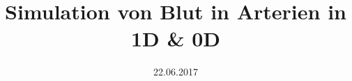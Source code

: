 \documentclass{beamer}
\title[Simulation von Blutfluss in Arterien]{Simulation von Blut in Arterien in 1D \& 0D}
\subtitle{}
\author{}
\date{22.06.2017}
\begin{document}
\begin{frame}[plain]
\maketitle
\end{frame}

% 

\end{document}
